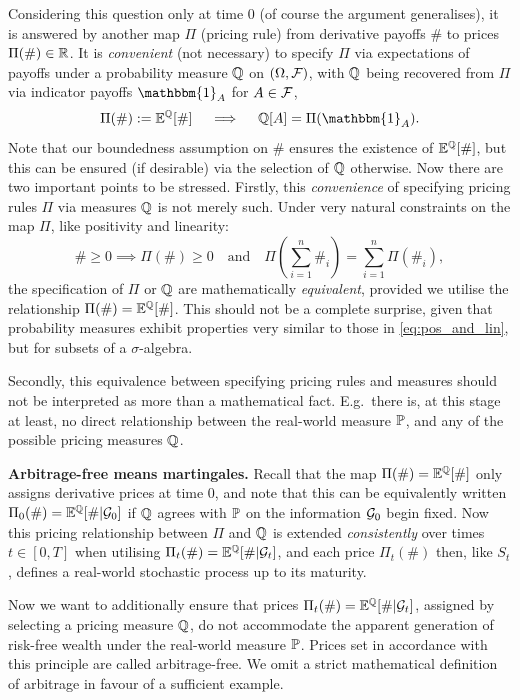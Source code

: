 Considering this question only at time 0 (of course the argument generalises), it is answered by another map $\Pi$ (pricing rule) from derivative payoffs $\#$ to prices $\Pi(\#)\in\mathbb{R}$. It is \emph{convenient} (not necessary) to specify $\Pi$ via expectations of payoffs under a probability measure $\mathbb{Q}$ on $(\Omega,\mathcal{F})$, with $\mathbb{Q}$ being recovered from $\Pi$ via indicator payoffs $\mathbbm{1}_{A}$ for $A\in\mathcal{F}$,
\begin{equation}
    \Pi(\#) := \EE^\QQ[\#]\quad\implies\quad \QQ[A] = \Pi(\mathbbm{1}_A).
\end{equation}
Note that our boundedness assumption on $\#$ ensures the existence of $\mathbb{E}^{\mathbb{Q}}[\#]$, but this can be ensured (if desirable) via the selection of $\mathbb{Q}$ otherwise. Now there are two important points to be stressed. Firstly, this \emph{convenience} of specifying pricing rules $\Pi$ via measures $\mathbb{Q}$ is not merely such. Under very natural constraints on the map $\Pi$, like positivity and linearity:
\begin{equation}\label{eq:pos_and_lin}
    \#\ge 0\implies \Pi(\#)\ge0\quad\text{and}\quad \Pi(\sum_{i=1}^n \#_i) = \sum_{i=1}^n\Pi(\#_i),
\end{equation}
the specification of $\Pi$ or $\mathbb{Q}$ are mathematically \emph{equivalent}, provided we utilise the relationship $\Pi(\#)=\mathbb{E}^{\mathbb{Q}}[\#]$. This should not be a complete surprise, given that probability measures exhibit properties very similar to those in \autoref{eq:pos_and_lin}, but for subsets of a $\sigma$-algebra.

Secondly, this equivalence between specifying pricing rules and measures should not be interpreted as more than a mathematical fact. E.g.~there is, at this stage at least, no direct relationship between the real-world measure $\mathbb{P}$, and any of the possible pricing measures $\mathbb{Q}$.

\vspace{3mm}\textbf{Arbitrage-free means martingales.} Recall that the map $\Pi(\#)=\mathbb{E}^{\mathbb{Q}}[\#]$ only assigns derivative prices at time 0, and note that this can be equivalently written $\Pi_0(\#)=\mathbb{E}^{\mathbb{Q}}[\#|\mathcal{G}_0]$ if $\mathbb{Q}$ agrees with $\mathbb{P}$ on the information $\mathcal{G}_0$ begin fixed. Now this pricing relationship between $\Pi$ and $\mathbb{Q}$ is extended \emph{consistently} over times $t\in[0,T]$ when utilising $\Pi_t(\#)=\mathbb{E}^{\mathbb{Q}}[\#|\mathcal{G}_t]$, and each price $\Pi_t(\#)$ then, like $S_t$, defines a real-world stochastic process up to its maturity.

Now we want to additionally ensure that prices $\Pi_t(\#)=\mathbb{E}^{\mathbb{Q}}[\#|\mathcal{G}_t]$, assigned by selecting a pricing measure $\mathbb{Q}$, do not accommodate the apparent generation of risk-free wealth under the real-world measure $\mathbb{P}$. Prices set in accordance with this principle are called arbitrage-free. We omit a strict mathematical definition of arbitrage in favour of a sufficient example.

